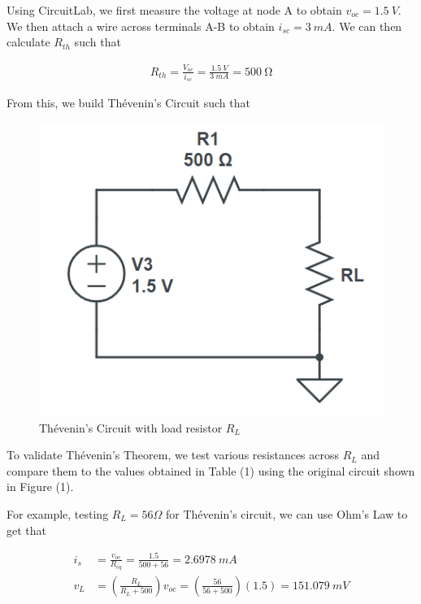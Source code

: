 \documentclass[12pt]{article}
\begin{document}
Using CircuitLab, we first measure the voltage at node A to obtain $v_{oc} = \SI{1.5}{V}$. We then attach a wire across terminals A-B to obtain $i_{sc} = \SI{3}{mA}$. We can then calculate $R_{th}$ such that

\begin{equation}
    \begin{split}
        R_{th} = \frac{V_{oc}}{i_{sc}} = \frac{\SI{1.5}{V}}{\SI{3}{mA}} = \SI{500}{\ohm}
    \end{split}
\end{equation}

From this, we build Thévenin's Circuit such that

\begin{figure}[H]
    \begin{center}
        \includegraphics[scale=0.7]{circuit-2.png}
        \caption { Thévenin's Circuit with load resistor $R_L$}
    \end{center}
\end{figure}

To validate Thévenin's Theorem, we test various resistances across $R_L$ and compare them to the values obtained in Table (1) using the original circuit shown in Figure (1). 

\pagebreak

For example, testing $R_L = 56\Omega$ for Thévenin's circuit, we can use Ohm's Law to get that

\begin{equation}
    \begin{split}
        i_{s} &= \frac{v_{oc}}{R_{eq}} = \frac{1.5}{500 + 56} = \SI{2.6978}{mA} \\
        v_{L} &= \left(\frac{R_L}{R_L + 500}\right)v_{oc} = \left(\frac{56}{56 + 500}\right)(1.5) = \SI{151.079}{mV}
    \end{split}
\end{equation}
\end{document}
